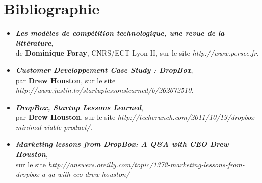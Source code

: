 \documentclass[a4paper, 10pt]{article}
\begin{document}
\section*{Bibliographie}
\begin{itemize}
 \item \textit{\textbf{Les modèles de compétition technologique, une revue de la littérature}},\\
de \textbf{Dominique Foray}, CNRS/ECT Lyon II, sur le site \textit{http://www.persee.fr}.
 \item \textit{\textbf{Customer Developpement Case Study : DropBox}},\\
par \textbf{Drew Houston}, sur le site \textit{http://www.justin.tv/startuplessonslearned/b/262672510}.
 \item \textit{\textbf{DropBox, Startup Lessons Learned}},\\
par \textbf{Drew Houston}, sur le site \textit{http://techcrunch.com/2011/10/19/dropbox-minimal-viable-product/}.
 \item \textit{\textbf{Marketing lessons from DropBox: A Q\&A with CEO Drew Houston}},\\
sur le site \textit{http://answers.oreilly.com/topic/1372-marketing-lessons-from-dropbox-a-qa-with-ceo-drew-houston/}
\end{itemize}
\end{document}
